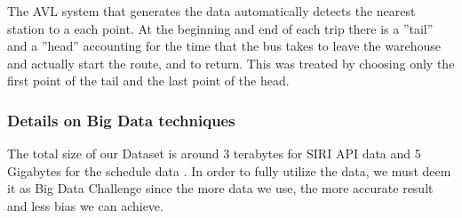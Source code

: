 \documentclass[12pt,journal,compsoc]{IEEEtran}
\begin{document}
The AVL system that generates the data automatically detects the nearest station to a each point. At the beginning and end of each trip there is a ''tail'' and a ''head'' accounting for the time that the bus takes to leave the warehouse and actually start the route, and to return. This was treated by choosing only the first point of the tail and the last point of the head.

\subsubsection{Details on Big Data techniques}

The total size of our Dataset is around 3 terabytes for SIRI API data and 5 Gigabytes for the schedule data . In order to fully utilize the data, we must deem it as Big Data Challenge since the more data we use, the more accurate result and less bias we can achieve.
\end{document}
